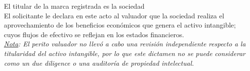 
El titular de la marca registrada \textcolor{principal}{\marca{}} es  la sociedad \textcolor{principal}{\empresaSolicitante}\\

El solicitante le declara en este acto al valuador que la sociedad 
\textcolor{principal}{\empresaSolicitante} realiza el aprovechamiento de los beneficios econ\'omicos que genera el activo intangible; cuyos flujos de efectivo se reflejan en los estados financieros.\\

\textit{\underline{Nota}: El perito valuador no llev\'o a cabo una revisi\'on independiente respecto a la titularidad del activo intangible, por lo que este dictamen no se puede considerar como un due diligence o una auditor\'ia de propiedad intelectual.}
